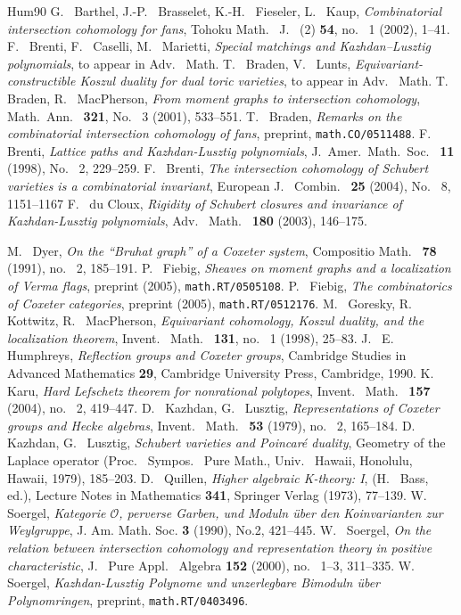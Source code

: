 \documentclass[12pt]{amsart}
\theoremstyle{definition}
\theoremstyle{remark}
\newcommand{\CO}{{\mathcal O}}
\begin{document}
\begin{thebibliography}{Hum90}
 G.~ Barthel, J.-P.~ Brasselet, K.-H.~ Fieseler, L.~ Kaup, {\em Combinatorial intersection cohomology for fans},  Tohoku Math.~ J.~ (2) {\bf 54},  no.~ 1  (2002), 1--41.
 F.~ Brenti, F.~ Caselli, M.~ Marietti, {\em Special matchings and Kazhdan--Lusztig polynomials}, to appear in Adv.~ Math.
 T.~ Braden, V.~ Lunts, {\em Equivariant-constructible Koszul duality for dual toric varieties}, to appear in Adv.~ Math.
 T.~ Braden, R.~ MacPherson, {\em From moment graphs to intersection cohomology}, Math.~Ann.~ {\bf 321}, No.~ 3 (2001), 533--551.
 T.~ Braden, {\em Remarks on the combinatorial intersection cohomology of fans}, preprint, {\tt math.CO/0511488}.
 F.~ Brenti, {\em Lattice paths and Kazhdan-Lusztig polynomials},  J.~Amer.~Math.~Soc.~ {\bf 11}  (1998),  No.~ 2, 229--259.
 F.~ Brenti, {\em The intersection cohomology of Schubert varieties is a combinatorial invariant},  European J.~ Combin.~  {\bf 25}  (2004),  No.~ 8, 1151--1167
 F.~ du Cloux, {\em Rigidity of Schubert closures and invariance of Kazhdan-Lusztig polynomials}, Adv.~ Math.~ {\bf 180} (2003), 146--175.

 M.~ Dyer, {\em On the ``Bruhat graph'' of a Coxeter system},  Compositio Math.~ {\bf 78}  (1991),  no.~ 2, 185--191.
 P.~ Fiebig, {\em Sheaves on moment graphs and a localization of Verma flags}, preprint (2005), {\tt math.RT/0505108}.
 P.~ Fiebig, {\em The combinatorics of Coxeter categories}, preprint (2005), {\tt math.RT/0512176}. 
 M.~ Goresky, R.~ Kottwitz, R.~ MacPherson,
{\em Equivariant cohomology, Koszul duality, and the localization theorem}, Invent.~ Math.~ {\bf 131}, no.~ 1 (1998), 25--83.
 J.~ E.~ Humphreys, {\em Reflection groups and Coxeter groups}, Cambridge Studies in Advanced Mathematics {\bf 29}, Cambridge University Press, Cambridge, 1990.
 K.~ Karu, {\em Hard Lefschetz theorem for nonrational polytopes},  Invent.~ Math.~  {\bf 157}  (2004),  no.~ 2, 419--447.
 D.~ Kazhdan, G.~ Lusztig, {\em Representations of Coxeter groups and Hecke algebras}, Invent.~ Math.~  {\bf 53}  (1979), no.~ 2, 165--184.
 D.~ Kazhdan, G.~ Lusztig, {\em Schubert varieties and Poincar\'e duality},
Geometry of the Laplace operator (Proc.~ Sympos.~ Pure Math., Univ.~ Hawaii, Honolulu, Hawaii, 1979), 185--203.
 D.~ Quillen, {\em Higher algebraic K-theory: I}, (H.~ Bass, ed.), Lecture Notes in Mathematics {\bf 341}, Springer Verlag (1973), 77--139.
 W.~ Soergel, {\em Kategorie $\CO$, perverse Garben, und Moduln {\"u}ber den Koinvarianten zur Weylgruppe}, J. Am. Math. Soc. {\bf 3} (1990), No.2, 421--445.
 W.~ Soergel, {\em On the relation between intersection cohomology and representation theory in positive characteristic}, J.~ Pure Appl.~ Algebra {\bf 152}  (2000),  no.~ 1--3, 311--335.
 W.~ Soergel, {\em Kazhdan-Lusztig Polynome und unzerlegbare Bimoduln {\"u}ber Polynomringen}, preprint, {\tt math.RT/0403496}.
\end{thebibliography}
\end{document}
